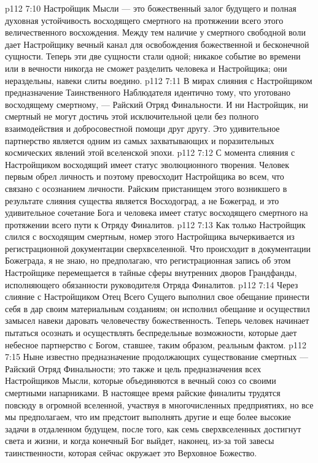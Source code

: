 \vs p112 7:10 Настройщик Мысли --- это божественный залог будущего и полная духовная устойчивость восходящего смертного на протяжении всего этого величественного восхождения. Между тем наличие у смертного свободной воли дает Настройщику вечный канал для освобождения божественной и бесконечной сущности. Теперь эти две сущности стали одной; никакое событие во времени или в вечности никогда не сможет разделить человека и Настройщика; они нераздельны, навеки слиты воедино.
\vs p112 7:11 \pc В мирах слияния с Настройщиком предназначение Таинственного Наблюдателя идентично тому, что уготовано восходящему смертному, --- Райский Отряд Финальности. И ни Настройщик, ни смертный не могут достичь этой исключительной цели без полного взаимодействия и добросовестной помощи друг другу. Это удивительное партнерство является одним из самых захватывающих и поразительных космических явлений этой вселенской эпохи.
\vs p112 7:12 С момента слияния с Настройщиком восходящий имеет статус эволюционного творения. Человек первым обрел личность и поэтому превосходит Настройщика во всем, что связано с осознанием личности. Райским пристанищем этого возникшего в результате слияния существа является Восходоград, а не Божеград, и это удивительное сочетание Бога и человека имеет статус восходящего смертного на протяжении всего пути к Отряду Финалитов.
\vs p112 7:13 Как только Настройщик слился с восходящим смертным, номер этого Настройщика вычеркивается из регистрационной документации сверхвселенной. Что происходит в документации Божеграда, я не знаю, но предполагаю, что регистрационная запись об этом Настройщике перемещается в тайные сферы внутренних дворов Грандфанды, исполняющего обязанности руководителя Отряда Финалитов.
\vs p112 7:14 Через слияние с Настройщиком Отец Всего Сущего выполнил свое обещание принести себя в дар своим материальным созданиям; он исполнил обещание и осуществил замысел навеки даровать человечеству божественность. Теперь человек начинает пытаться осознать и осуществлять беспредельные возможности, которые дает небесное партнерство с Богом, ставшее, таким образом, реальным фактом.
\vs p112 7:15 \pc Ныне известно предназначение продолжающих существование смертных --- Райский Отряд Финальности; это также и цель предназначения всех Настройщиков Мысли, которые объединяются в вечный союз со своими смертными напарниками. В настоящее время райские финалиты трудятся повсюду в огромной вселенной, участвуя в многочисленных предприятиях, но все мы предполагаем, что им предстоит выполнять другие и еще более высокие задачи в отдаленном будущем, после того, как семь сверхвселенных достигнут света и жизни, и когда конечный Бог выйдет, наконец, из\hyp{}за той завесы таинственности, которая сейчас окружает это Верховное Божество.
